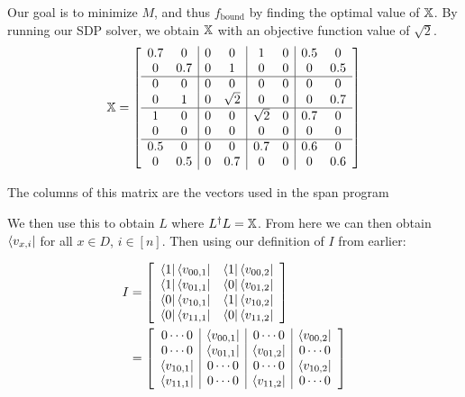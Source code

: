 Our goal is to minimize $M$, and thus $f_{\text{bound}}$ by finding the optimal value of $\operatorname{\mathbb{X}}$. By running our SDP solver, we obtain $\operatorname{\mathbb{X}}$ with an objective function value of $\sqrt{2}$.
\begin{align}
    \operatorname{\mathbb{X}} = \left[ \begin{array}{cc|cc|cc|cc}
    0.7 & 0 & 0 & 0 & 1 & 0 & 0.5 & 0\\
    0 & 0.7 & 0 & 1 & 0 & 0 & 0 & 0.5\\
    \hline
    0 & 0 & 0 & 0 & 0 & 0 & 0 & 0\\
    0 & 1 & 0 & \sqrt{2} & 0 & 0 & 0 & 0.7\\
    \hline
    1 & 0 & 0 & 0 & \sqrt{2} & 0 & 0.7 & 0\\
    0 & 0 & 0 & 0 & 0 & 0 & 0 & 0\\
    \hline
    0.5 & 0 & 0 & 0 & 0.7 & 0 & 0.6 & 0\\
    0 & 0.5 & 0 & 0.7 & 0 & 0 & 0 & 0.6\\
    \end{array}
\right] \nonumber
\end{align}

The columns of this matrix are the vectors used in the span program 

We then use this to obtain $L$ where $L^\dagger L = \operatorname{\mathbb{X}}$. From here we can then obtain $\bra{v_{x,i}}$ for all $x \in D$, $i \in [n]$. Then using our definition of $I$ from earlier:

\begin{align}
I &= \left[\begin{array}{cc}
    \bra{1}\bra{v_{00,1}} & \bra{1}\bra{v_{00,2}} \\
    \bra{1}\bra{v_{01,1}} & \bra{0}\bra{v_{01,2}} \\
    \bra{0}\bra{v_{10,1}} & \bra{1}\bra{v_{10,2}}\\
    \bra{0}\bra{v_{11,1}} & \bra{0}\bra{v_{11,2}}\\
\end{array} \right] \nonumber \\
&= \left[\begin{array}{c|c|c|c}
    0 \cdots 0 & \bra{v_{00,1}} & 0 \cdots 0 & \bra{v_{00,2}} \\
    0 \cdots 0 & \bra{v_{01,1}} & \bra{v_{01,2}} & 0 \cdots 0\\
    \bra{v_{10,1}} & 0 \cdots 0 & 0 \cdots 0 & \bra{v_{10,2}}\\
    \bra{v_{11,1}} & 0 \cdots 0 & \bra{v_{11,2}} & 0 \cdots 0\\
\end{array} \right] \nonumber
\end{align}

